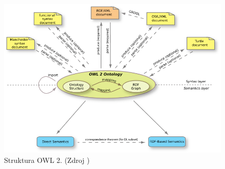 \begin{figure}[h]
\begin{center}
\includegraphics[width=16cm]{figures/OWL2-structure}
\caption{Struktura OWL 2. (Zdroj \cite{owl2})}
\label{img:owl2}
\end{center}
\end{figure}
